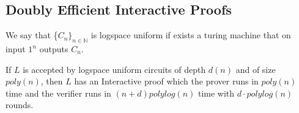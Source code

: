 

\subsection{Doubly Efficient Interactive Proofs}
\begin{definition}
	We say that \{$C_n\}_{n\in\mathbb{N}}$ is logspace uniform if exists
	a turing machine that on input $1^n$ outputs $C_n$.
\end{definition}

\begin{theorem}
	If $L$ is accepted by logspace uniform circuits of depth $d(n)$ and of size $poly(n)$,
	then $L$ has an Interactive proof which the prover runs in $poly(n)$
	time and the verifier runs in $(n+d)polylog(n)$ time with $d\cdot polylog(n)$ rounds.
\end{theorem}